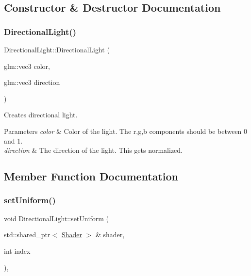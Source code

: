 \subsection{Constructor \& Destructor Documentation}
\mbox{\label{class_directional_light_aaeeb1532c03c9ea6b3f4a8d4c6407f04}} 
\subsubsection{\texorpdfstring{DirectionalLight()}{DirectionalLight()}}
{\footnotesize\ttfamily Directional\+Light\+::\+Directional\+Light (\begin{DoxyParamCaption}\item[{glm\+::vec3}]{color,  }\item[{glm\+::vec3}]{direction }\end{DoxyParamCaption})}

Creates directional light.


\begin{DoxyParams}{Parameters}
{\em color} & Color of the light. The r,g,b components should be between 0 and 1. \\
\hline
{\em direction} & The direction of the light. This gets normalized. \\
\hline
\end{DoxyParams}


\subsection{Member Function Documentation}
\mbox{\label{class_directional_light_a81d638a84a99683bf260efd871fdf1e2}} 
\subsubsection{\texorpdfstring{setUniform()}{setUniform()}}
{\footnotesize\ttfamily void Directional\+Light\+::set\+Uniform (\begin{DoxyParamCaption}\item[{std\+::shared\+\_\+ptr$<$ \mbox{\hyperlink{class_shader}{Shader}} $>$ \&}]{shader,  }\item[{int}]{index }\end{DoxyParamCaption})\hspace{0.3cm}{\ttfamily [protected]}, {\ttfamily [virtual]}}


